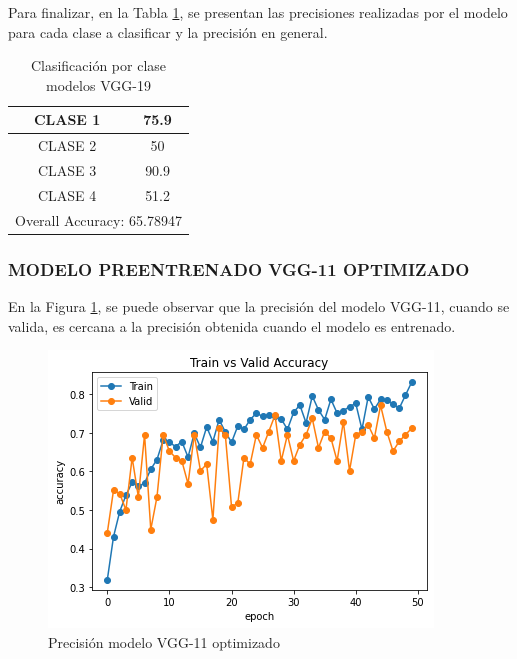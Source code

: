 Para finalizar, en la Tabla \ref{tab:VGG19optclases}, se presentan las precisiones realizadas por el modelo para cada clase a clasificar y la precisión en general.
\begin{table}[htbp]
	\centering
	\begin{tabular}{|c|c|}
		\hline
		CLASE 1 & 75.9 \bigstrut\\
		\hline
		CLASE 2 & 50 \bigstrut\\
		\hline
		CLASE 3 & 90.9 \bigstrut\\
		\hline
		CLASE 4 & 51.2 \bigstrut\\
		\hline
		\multicolumn{2}{|c|}{Overall Accuracy: 65.78947} \bigstrut\\
		\hline
	\end{tabular}%
	\caption{Clasificación por clase modelos VGG-19}
	\label{tab:VGG19optclases}%
\end{table}%

\newpage	
\subsubsection{\MakeUppercase{Modelo preentrenado VGG-11 optimizado}}
En la Figura \ref{fig:preci_vgg11_OPT}, se puede observar que la precisión del modelo VGG-11, cuando se valida, es cercana a la precisión obtenida cuando el modelo es entrenado.

\begin{figure}[ht]
	\centering
	\includegraphics[scale=0.6]{Figs/508.png}
	\caption{Precisión modelo VGG-11 optimizado}
	\label{fig:preci_vgg11_OPT}
\end{figure}

